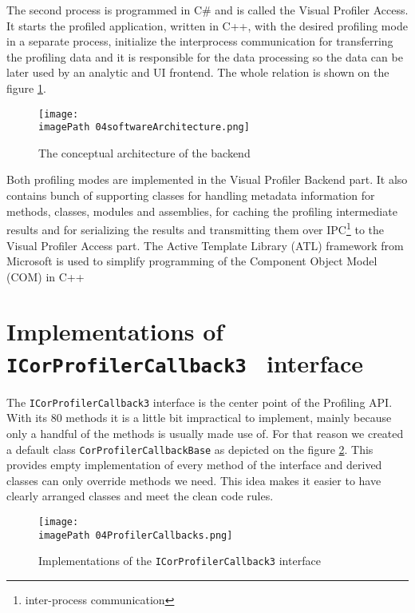 The second process is programmed in C\# and is called the Visual Profiler Access. It starts the profiled application, written in C++, with the desired profiling mode in a separate process, initialize the interprocess communication for transferring the profiling data and it is responsible for the data processing so the data can be later used by an analytic and UI frontend. The whole relation is shown on the figure  \ref{fig:04softwareArchitecture}.

\begin{figure}
	\centering
		\texttt{[image: \\imagePath 04softwareArchitecture.png]}
		\caption{The conceptual architecture of the backend}
	\label{fig:04softwareArchitecture}
\end{figure}

Both profiling modes are implemented in the Visual Profiler Backend part. It also contains bunch of supporting classes for handling metadata information for methods, classes, modules and assemblies, for caching the profiling intermediate results and for serializing the results and transmitting them over IPC\footnote{inter-process communication} to the Visual Profiler Access part. The Active Template Library (ATL) framework from Microsoft is used to simplify programming of the Component Object Model (COM) in C++

\section{Implementations of \texttt{ICorProfilerCallback3 } interface}
The \texttt{ICorProfilerCallback3} interface is the center point of the Profiling API. With its 80 methods it is a little bit impractical to implement, mainly because only a handful of the methods is usually made use of. For that reason we created a default class \texttt{CorProfilerCallbackBase} as depicted on the figure \ref{fig:04ProfilerCallbacks}. This provides empty implementation of every method of the interface and derived classes can only override methods we need. This idea makes it easier to have clearly arranged classes and meet the clean code rules.

\begin{figure}
	\centering
		\texttt{[image: \\imagePath 04ProfilerCallbacks.png]}
		\caption{Implementations of the \texttt{ICorProfilerCallback3} interface}
	\label{fig:04ProfilerCallbacks}
\end{figure}

